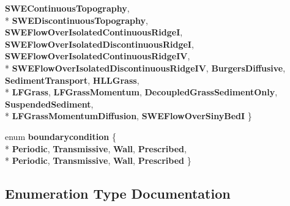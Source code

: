 \begin{DoxyCompactItemize}
{\bf S\-W\-E\-Continuous\-Topography}, 
\\*
{\bf S\-W\-E\-Discontinuous\-Topography}, 
{\bf S\-W\-E\-Flow\-Over\-Isolated\-Continuous\-Ridge\-I}, 
{\bf S\-W\-E\-Flow\-Over\-Isolated\-Discontinuous\-Ridge\-I}, 
{\bf S\-W\-E\-Flow\-Over\-Isolated\-Continuous\-Ridge\-I\-V}, 
\\*
{\bf S\-W\-E\-Flow\-Over\-Isolated\-Discontinuous\-Ridge\-I\-V}, 
{\bf Burgers\-Diffusive}, 
{\bf Sediment\-Transport}, 
{\bf H\-L\-L\-Grass}, 
\\*
{\bf L\-F\-Grass}, 
{\bf L\-F\-Grass\-Momentum}, 
{\bf Decoupled\-Grass\-Sediment\-Only}, 
{\bf Suspended\-Sediment}, 
\\*
{\bf L\-F\-Grass\-Momentum\-Diffusion}, 
{\bf S\-W\-E\-Flow\-Over\-Siny\-Bed\-I}
 \}
\item 
enum {\bf boundarycondition} \{ \\*
{\bf Periodic}, 
{\bf Transmissive}, 
{\bf Wall}, 
{\bf Prescribed}, 
\\*
{\bf Periodic}, 
{\bf Transmissive}, 
{\bf Wall}, 
{\bf Prescribed}
 \}
\end{DoxyCompactItemize}


\subsection{Enumeration Type Documentation}
